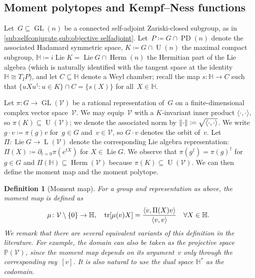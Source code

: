 \documentclass[11pt,letterpaper]{article}
\newtheorem{definition}[theorem]{Definition}\AddToHook{env/definition/begin}{\crefalias{theorem}{definition}}
\numberwithin{equation}{section}
\newcommand{\bbH}{\mathbb{H}}
\newcommand{\bbP}{\mathbb{P}}
\newcommand{\VV}{\mathcal{V}}
\DeclareMathOperator{\PD}{PD}
\DeclareMathOperator{\U}{U}
\DeclareMathOperator{\GL}{GL}
\DeclareMathOperator{\Lin}{L}
\DeclareMathOperator{\tr}{tr}
\DeclareMathOperator{\Lie}{Lie}
\DeclareMathOperator{\Herm}{Herm}
\DeclarePairedDelimiter\norm{\lVert}{\rVert}
\begin{document}
\subsection{Moment polytopes and Kempf--Ness functions}\label{sub:momentpolytope-general}
Let~$G \subseteq \GL(n)$ be a connected self-adjoint Zariski-closed subgroup, as in \cref{sub:selfconjugate,sub:objective selfadjoint}.
Let~$P \coloneqq G \cap \PD(n)$ denote the associated Hadamard symmetric space, $K \coloneqq G \cap \U(n)$ the maximal compact subgroup, $\bbH \coloneqq i\Lie K = \Lie G \cap \Herm(n)$ the Hermitian part of the Lie algebra (which is naturally identified with the tangent space at the identity $\bbH \cong T_IP$), and let $C \subseteq \bbH$ denote a Weyl chamber; recall the map $s \colon \bbH \to C$ such that $\{u X u^\dagger : u \in K\} \cap C = \{s(X)\}$ for all~$X \in \bbH$.

Let $\pi \colon G \to \GL(\VV)$ be a rational representation of~$G$ on a finite-dimensional complex vector space~$\VV$.
We may equip~$\VV$ with a $K$-invariant inner product $\langle\cdot,\cdot\rangle$, so $\pi(K) \subseteq \U(\VV)$;
we denote the associated norm by $\norm\cdot \coloneqq \sqrt{\langle\cdot,\cdot\rangle}$.
We write $g \cdot v \coloneqq \pi(g)v$ for~$g \in G$ and~$v \in \VV$, so $G \cdot v$ denotes the orbit of~$v$.
Let $\Pi \colon \Lie G \to \Lin(\VV)$ denote the corresponding Lie algebra representation:
$\Pi(X)\coloneqq\partial_{t=0} \pi(e^{tX})$ for $X\in\Lie G$.
We observe that $\pi(g^\dagger) = \pi(g)^\dagger$ for $g \in G$ and $\Pi(\bbH) \subseteq \Herm(\VV)$ because $\pi(K) \subseteq \U(\VV)$.
We can then define the moment map and the moment polytope.

\begin{definition}[Moment map]
For a group and representation as above, the \emph{moment map} is defined as
\begin{equation}\label{eq:moment map}
    \mu \colon \VV\setminus\{0\}\rightarrow \bbH, \quad \tr\mleft[ \mu(v) X \mright] = \frac{\langle v, \Pi(X) v\rangle}{\langle v,v\rangle}
    \quad \forall X\in \bbH.
\end{equation}
We remark that there are several equivalent variants of this definition in the literature.
For example, the domain can also be taken as the projective space~$\bbP(\VV)$, since the moment map depends on its argument~$v$ only through the corresponding ray~$[v]$.
It is also natural to use the dual space $\bbH^*$ as the codomain.
\end{definition}
\end{document}
